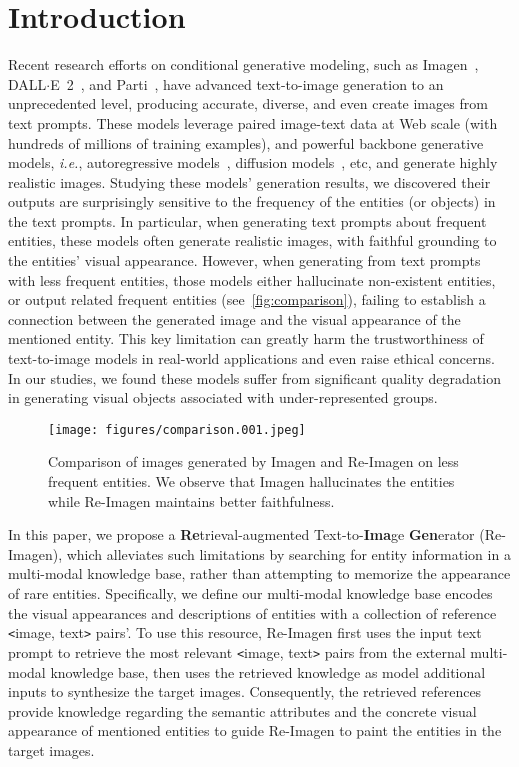 \documentclass{article} \usepackage{iclr2023_conference,times}
\newcommand{\ie}{\textit{i.e.}}
\newcommand{\modelname}{{Re-Imagen}\xspace}
\begin{document}
\section{Introduction}
Recent research efforts on conditional generative modeling, such as Imagen~\citep{saharia2022photorealistic}, DALL$\cdot$E~2~\citep{ramesh2022hierarchical}, and Parti~\citep{yu2022scaling}, have advanced text-to-image generation to an unprecedented level, producing accurate, diverse, and even create images from text prompts. These models leverage paired image-text data at Web scale (with hundreds of millions of training examples), and powerful backbone generative models, \ie, autoregressive models~\citep{van2017neural,ramesh2021zero,yu2022scaling}, diffusion models~\citep{ho2020denoising,dhariwal2021diffusion}, etc, and generate highly realistic images. Studying these models' generation results, we discovered their outputs are surprisingly sensitive to the frequency of the entities (or objects) in the text prompts. In particular, when generating text prompts about frequent entities, these models often generate realistic images, with faithful grounding to the entities' visual appearance. However, when generating from text prompts with less frequent entities, those models either hallucinate non-existent entities, or output related frequent entities (see~\autoref{fig:comparison}), failing to establish a connection between the generated image and the visual appearance of the mentioned entity. This key limitation can greatly harm the trustworthiness of text-to-image models in real-world applications and even raise ethical concerns. In our studies, we found these models suffer from significant quality degradation in generating visual objects associated with under-represented groups.

\begin{figure}[!thb]
    \centering
    \texttt{[image: figures/comparison.001.jpeg]}
    \caption{{Comparison of images generated by Imagen and \modelname on less frequent entities}. We observe that Imagen hallucinates the entities while \modelname maintains better faithfulness.}
    \label{fig:comparison}
    \vspace{-2ex}
\end{figure}
In this paper, we propose a \textbf{Re}trieval-augmented Text-to-\textbf{Ima}ge \textbf{Gen}erator (\modelname), which alleviates such limitations by searching for entity information in a multi-modal knowledge base, rather than attempting to memorize the appearance of rare entities. Specifically, we define our multi-modal knowledge base encodes the visual appearances and descriptions of entities with a collection of reference \texttt{<}image, text\texttt{>} pairs'. To use this resource, \modelname first uses the input text prompt to retrieve the most relevant \texttt{<}image, text\texttt{>} pairs from the external multi-modal knowledge base, then uses the retrieved knowledge as model additional inputs to synthesize the target images. Consequently, the retrieved references provide knowledge regarding the semantic attributes and the concrete visual appearance of mentioned entities to guide \modelname to paint the entities in the target images. 
\end{document}
